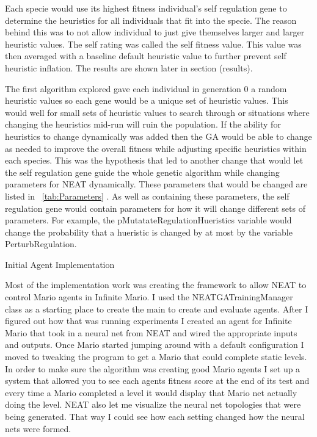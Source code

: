 \documentclass[12pt]{ucthesis} \newif\ifpdf \ifx\pdfoutput\undefined
\begin{document}
Each specie would use its highest fitness individual’s self regulation gene to
determine the heuristics for all individuals that fit into the specie. The
reason behind this was to not allow individual to just give themselves larger
and larger heuristic values. The self rating was called the self fitness value.
This value was then averaged with a baseline default heuristic value to further
prevent self heuristic inflation. The results are shown later in section
(results).

The first algorithm explored gave each individual in generation 0 a random
heuristic values so each gene would be a unique set of heuristic values. This
would well for small sets of heuristic values to search through or situations
where changing the heuristics mid-run will ruin the population. If the ability
for heuristics to change dynamically was added then the GA would be able to
change as needed to improve the overall fitness while adjusting specific
heuristics within each species. This was the hypothesis that led to another
change that would let the self regulation gene guide the whole genetic algorithm
while changing parameters for NEAT dynamically. These parameters that would be
changed are listed in ~\ref{tab:Parameters} . As well as containing these
parameters, the self regulation gene would contain parameters for how it will
change different sets of parameters. For example, the
pMutatateRegulationHueristics variable would change the probability that a
hueristic is changed by at most by the variable PerturbRegulation.


Initial Agent Implementation

Most of the implementation work was creating the framework to allow NEAT to
control Mario agents in Infinite Mario. I used the NEATGATrainingManager class
as a starting place to create the main to create and evaluate agents. After I
figured out how that was running experiments I created an agent for Infinite
Mario that took in a neural net from NEAT and wired the appropriate inputs and
outputs. Once Mario started jumping around with a default configuration I moved
to tweaking the program to get a Mario that could complete static levels.
In order to make sure the algorithm was creating good Mario agents I set up a
system that allowed you to see each agents fitness score at the end of its test
and every time a Mario completed a level it would display that Mario net
actually doing the level. NEAT also let me visualize the neural net topologies
that were being generated. That way I could see how each setting changed how the
neural nets were formed.
 
\end{document}
